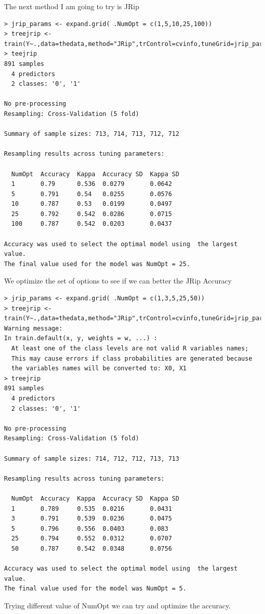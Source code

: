 \documentclass[fontsize=10pt]{scrartcl}
\begin{document}
\begin{enumerate}
		The next method I am going to try is JRip

\begin{verbatim}
> jrip_params <- expand.grid( .NumOpt = c(1,5,10,25,100))
> treejrip <-train(Y~.,data=thedata,method="JRip",trControl=cvinfo,tuneGrid=jrip_params)
> teejrip
891 samples
  4 predictors
  2 classes: '0', '1' 

No pre-processing
Resampling: Cross-Validation (5 fold) 

Summary of sample sizes: 713, 714, 713, 712, 712 

Resampling results across tuning parameters:

  NumOpt  Accuracy  Kappa  Accuracy SD  Kappa SD
  1       0.79      0.536  0.0279       0.0642  
  5       0.791     0.54   0.0255       0.0576  
  10      0.787     0.53   0.0199       0.0497  
  25      0.792     0.542  0.0286       0.0715  
  100     0.787     0.542  0.0203       0.0437  

Accuracy was used to select the optimal model using  the largest value.
The final value used for the model was NumOpt = 25. 
\end{verbatim}

			We optimize the set of options to see if we can better the JRip Accuracy

\begin{verbatim}
> jrip_params <- expand.grid( .NumOpt = c(1,3,5,25,50))
> treejrip <-train(Y~.,data=thedata,method="JRip",trControl=cvinfo,tuneGrid=jrip_params)
Warning message:
In train.default(x, y, weights = w, ...) :
  At least one of the class levels are not valid R variables names; 
  This may cause errors if class probabilities are generated because 
  the variables names will be converted to: X0, X1
> treejrip
891 samples
  4 predictors
  2 classes: '0', '1' 

No pre-processing
Resampling: Cross-Validation (5 fold) 

Summary of sample sizes: 714, 712, 712, 713, 713 

Resampling results across tuning parameters:

  NumOpt  Accuracy  Kappa  Accuracy SD  Kappa SD
  1       0.789     0.535  0.0216       0.0431  
  3       0.791     0.539  0.0236       0.0475  
  5       0.796     0.556  0.0403       0.083   
  25      0.794     0.552  0.0312       0.0707  
  50      0.787     0.542  0.0348       0.0756  

Accuracy was used to select the optimal model using  the largest value.
The final value used for the model was NumOpt = 5. 
\end{verbatim}
			Trying different value of NumOpt we can try and optimize the accuracy.


\end{enumerate}
\end{document}
